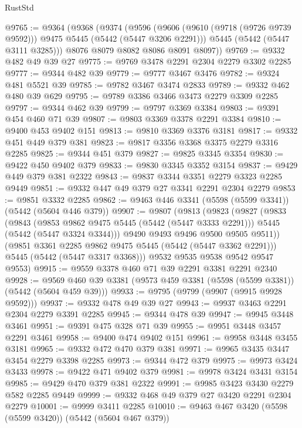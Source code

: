 \begin{lexlean}{RustStd}
\begin{coremodule}
@9765 := @9364
    (@9368
      (@9374
        (@9596
          (@9606 (@9610 (@9718 (@9726 @9739 @9592))) @9475 @5445 (@5442 (@5447 @3206 @2291)))
          @5445
          (@5442 (@5447 @3111 @3285)))
        @8076
        @8079
        @8082
        @8086
        @8091
        @8097))
@9769 := @9332 @482 @49 @39 @27
@9775 := @9769 @3478 @2291 @2304 @2279 @3302 @2285
@9777 := @9344 @482 @39
@9779 := @9777 @3467 @3476
@9782 := @9324 @481 @5521 @39
@9785 := @9782 @3467 @3474 @2833
@9789 := @9332 @462 @480 @39 @629
@9795 := @9789 @3386 @3466 @3473 @2279 @3309 @2285
@9797 := @9344 @462 @39
@9799 := @9797 @3369 @3384
@9803 := @9391 @454 @460 @71 @39
@9807 := @9803 @3369 @3378 @2291 @3384
@9810 := @9400 @453 @9402 @151
@9813 := @9810 @3369 @3376 @3181
@9817 := @9332 @451 @449 @379 @381
@9823 := @9817 @3356 @3368 @3375 @2279 @3316 @2285
@9825 := @9344 @451 @379
@9827 := @9825 @3345 @3354
@9830 := @9422 @450 @9402 @379
@9833 := @9830 @3345 @3352 @3154
@9837 := @9429 @449 @379 @381 @2322
@9843 := @9837 @3344 @3351 @2279 @3323 @2285 @9449
@9851 := @9332 @447 @49 @379 @27 @3341 @2291 @2304 @2279
@9853 := @9851 @3332 @2285
@9862 := @9463 @446 @3341 (@5598 (@5599 @3341)) (@5442 (@5604 @446 @379))
@9907 := @9807
    (@9813
      (@9823
        (@9827
          (@9833
            (@9843
              (@9853 @9862 @9475 @5445 (@5442 (@5447 @3333 @2291)))
              @5445
              (@5442 (@5447 @3324 @3344)))
            @9490
            @9493
            @9496
            @9500
            @9505
            @9511))
        (@9851 @3361 @2285 @9862 @9475 @5445 (@5442 (@5447 @3362 @2291)))
        @5445
        (@5442 (@5447 @3317 @3368)))
      @9532
      @9535
      @9538
      @9542
      @9547
      @9553)
@9915 := @9559 @3378 @460 @71 @39 @2291 @3381 @2291 @2340
@9928 := @9569 @460 @39 @3381 (@9573 @459 @3381 (@5598 (@5599 @3381)) (@5442 (@5604 @459 @39)))
@9933 := @9795 (@9799 (@9907 (@9915 @9928 @9592)))
@9937 := @9332 @478 @49 @39 @27
@9943 := @9937 @3463 @2291 @2304 @2279 @3391 @2285
@9945 := @9344 @478 @39
@9947 := @9945 @3448 @3461
@9951 := @9391 @475 @328 @71 @39
@9955 := @9951 @3448 @3457 @2291 @3461
@9958 := @9400 @474 @9402 @151
@9961 := @9958 @3448 @3455 @3181
@9965 := @9332 @472 @470 @379 @381
@9971 := @9965 @3435 @3447 @3454 @2279 @3398 @2285
@9973 := @9344 @472 @379
@9975 := @9973 @3424 @3433
@9978 := @9422 @471 @9402 @379
@9981 := @9978 @3424 @3431 @3154
@9985 := @9429 @470 @379 @381 @2322
@9991 := @9985 @3423 @3430 @2279 @582 @2285 @9449
@9999 := @9332 @468 @49 @379 @27 @3420 @2291 @2304 @2279
@10001 := @9999 @3411 @2285
@10010 := @9463 @467 @3420 (@5598 (@5599 @3420)) (@5442 (@5604 @467 @379))

\end{coremodule}
\end{lexlean}
